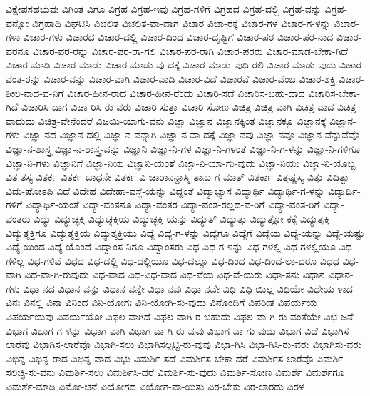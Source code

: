 {ವಿಕ್ಷೇಪಸಹಭುವಃ
ವಿಗಿಂತ
ವಿಗೂ
ವಿಗ್ರಹ
ವಿಗ್ರಹ-ಇವು
ವಿಗ್ರಹ-ಗಳಿಗೆ
ವಿಗ್ರಹದ
ವಿಗ್ರಹ-ದಲ್ಲಿ
ವಿಗ್ರಹ-ವನ್ನು
ವಿಗ್ರಹ-ವನ್ನೋ
ವಿಗ್ರಹಾದಿ
ವಿಘಟಿಸಿ
ವಿಚಲಿತ
ವಿಚಲಿತ-ವಾ-ದಾಗ
ವಿಚಾರ
ವಿಚಾ-ರಕ್ಕೆ
ವಿಚಾರ-ಗಳ
ವಿಚಾರ-ಗ-ಳನ್ನು
ವಿಚಾರ-ಗಳಾ
ವಿಚಾರ-ಗಳು
ವಿಚಾರದ
ವಿಚಾರ-ದಲ್ಲಿ
ವಿಚಾರ-ದಿಂದ
ವಿಚಾರ-ದೃಷ್ಟಿಗೆ
ವಿಚಾರ-ಪರ
ವಿಚಾರ-ಪರ-ನಾದ
ವಿಚಾರ-ಪರನೂ
ವಿಚಾರ-ಪರ-ರನ್ನು
ವಿಚಾರ-ಪರ-ರಾ-ಗಲಿ
ವಿಚಾರ-ಪರ-ರಾಗಿ
ವಿಚಾರ-ಪರರು
ವಿಚಾರ-ಮಾಡ-ಬೇಕಾ-ಗಿದೆ
ವಿಚಾರ-ಮಾಡಿ
ವಿಚಾರ-ಮಾಡು
ವಿಚಾರ-ಮಾಡು-ವು-ದಕ್ಕೆ
ವಿಚಾರ-ಮಾಡು-ವುದಿ-ರಲಿ
ವಿಚಾರ-ಮಾಡು-ವುದು
ವಿಚಾರ-ವಂತ-ರನ್ನು
ವಿಚಾರ-ವನ್ನು
ವಿಚಾರ-ವಾಗಿ
ವಿಚಾರ-ವಾದಿ
ವಿಚಾರ-ವಿದೆ
ವಿಚಾರವೆ
ವಿಚಾರ-ವೆಂಬ
ವಿಚಾರ-ಶಕ್ತಿ
ವಿಚಾರ-ಶೀಲ-ನಾದ-ವ-ನಿಗೆ
ವಿಚಾರ-ಹೀನ-ರಾದ
ವಿಚಾರ-ಹೀನ-ರೆಂದು
ವಿಚಾರಿ-ಸದೆ
ವಿಚಾರಿಸ-ಬಹು-ದಾದ
ವಿಚಾರಿಸ-ಬೇಕಾ-ಗಿದೆ
ವಿಚಾರಿಸಿ-ದಾಗ
ವಿಚಾ-ರಿಸಿ-ರು-ವರು
ವಿಚಾರಿ-ಸುತ್ತಾ
ವಿಚಾರಿ-ಸೋಣ
ವಿಚಿತ್ರ
ವಿಚಿತ್ರ-ವಾಗಿ
ವಿಚಿತ್ರ-ವಾದ
ವಿಚಿತ್ರ-ವಾದುದು
ವಿಚಿತ್ರ-ವೇನೆಂದರೆ
ವಿಜಯಿ-ಯಾಗು-ವನು
ವಿಜ್ಞಾ
ವಿಜ್ಞಾನ
ವಿಜ್ಞಾನಕ್ಕಿಂತ
ವಿಜ್ಞಾನಕ್ಕೂ
ವಿಜ್ಞಾನಕ್ಕೆ
ವಿಜ್ಞಾನ-ಗಳು
ವಿಜ್ಞಾ-ನದ
ವಿಜ್ಞಾನ-ದಲ್ಲಿ
ವಿಜ್ಞಾ-ನ-ವನ್ನಾಗಿ
ವಿಜ್ಞಾ-ನ-ವಾ-ದಕ್ಕೆ
ವಿಜ್ಞಾ-ನವು
ವಿಜ್ಞಾ-ನವೂ
ವಿಜ್ಞಾನ-ವೆನ್ನುವೆವೊ
ವಿಜ್ಞಾ-ನ-ಶಾಸ್ತ್ರ
ವಿಜ್ಞಾ-ನ-ಶಾಸ್ತ್ರ-ವನ್ನು
ವಿಜ್ಞಾನಿ
ವಿಜ್ಞಾ-ನಿ-ಗಳ
ವಿಜ್ಞಾ-ನಿ-ಗಳಂತೆ
ವಿಜ್ಞಾ-ನಿ-ಗ-ಳನ್ನು
ವಿಜ್ಞಾ-ನಿ-ಗಳಿಗೂ
ವಿಜ್ಞಾ-ನಿ-ಗಳು
ವಿಜ್ಞಾನಿಗೆ
ವಿಜ್ಞಾ-ನಿಯ
ವಿಜ್ಞಾನಿ-ಯಂತೆ
ವಿಜ್ಞಾ-ನಿ-ಯಾ-ಗು-ವುದು
ವಿಜ್ಞಾ-ನಿಯು
ವಿಜ್ಞಾ-ನಿ-ಯೊಬ್ಬ
ವಿತ-ತಸ್ಯ
ವಿತರ್ಕ
ವಿತರ್ಕ-ಬಾಧನೇ
ವಿತರ್ಕ-ವಿ-ಚಾರಾನನ್ದಾಸ್ಮಿ-ತಾನು-ಗ-ಮಾತ್
ವಿತರ್ಕಾ
ವಿತೃಷ್ಣಸ್ಯ
ವಿತ್ತು
ವಿದಿತ್ವಾ
ವಿದು-ಷೋಽಪಿ
ವಿದೆ
ವಿದೇಹ
ವಿದೇಹಾ-ವಸ್ಥೆ-ಯನ್ನು
ವಿದ್ದಂತೆ
ವಿದ್ಯಾಭ್ಯಾಸ
ವಿದ್ಯಾರ್ಥಿ
ವಿದ್ಯಾರ್ಥಿ-ಗ-ಳನ್ನು
ವಿದ್ಯಾರ್ಥಿ-ಗಳಿಗೆ
ವಿದ್ಯಾರ್ಥಿ-ಯಂತೆ
ವಿದ್ಯಾ-ವಂತನೂ
ವಿದ್ಯಾ-ವಂತರ
ವಿದ್ಯಾ-ವಂತ-ರಲ್ಲದ-ವ-ರಿಗೆ
ವಿದ್ಯಾ-ವಂತ-ರಿಗೆ
ವಿದ್ಯಾ-ವಂತರು
ವಿದ್ಯು
ವಿದ್ಯುಚ್ಛಕ್ತಿ
ವಿದ್ಯುಚ್ಛಕ್ತಿಯ
ವಿದ್ಯುಚ್ಛಕ್ತಿ-ಯನ್ನು
ವಿದ್ಯುತ್
ವಿದ್ಯುತ್ತು
ವಿದ್ಯುತ್ಲೋ-ಕಕ್ಕೆ
ವಿದ್ಯುತ್ಶಕ್ತಿ
ವಿದ್ಯುತ್ಶಕ್ತಿಗೂ
ವಿದ್ಯುತ್ಶಕ್ತಿಯ
ವಿದ್ಯುತ್ಶಕ್ತಿಯು
ವಿದ್ಯೆ
ವಿದ್ಯೆ-ಗ-ಳನ್ನು
ವಿದ್ಯೆಗೂ
ವಿದ್ಯೆಗೆ
ವಿದ್ಯೆಯ
ವಿದ್ಯೆ-ಯನ್ನು
ವಿದ್ಯೆ-ಯಷ್ಟು
ವಿದ್ಯೆ-ಯಿಂದ
ವಿದ್ಯೆ-ಯೊಂದೆ
ವಿದ್ವಾಂಸ-ನಿಗೂ
ವಿದ್ವಾಂಸರು
ವಿಧ
ವಿಧ-ಗ-ಳನ್ನು
ವಿಧ-ಗಳಲ್ಲಿ
ವಿಧ-ಗಳಲ್ಲಿಯೂ
ವಿಧ-ಗಳಿಲ್ಲ
ವಿಧ-ಗಳಿವೆ
ವಿಧದ
ವಿಧ-ದಲ್ಲಿ
ವಿಧ-ದಲ್ಲಿಯೂ
ವಿಧ-ದಲ್ಲೂ
ವಿಧ-ದಿಂದ
ವಿಧ-ದಿಂದ-ಲಾ-ದರೂ
ವಿಧಧ
ವಿಧ-ವಾಗಿ
ವಿಧ-ವಾ-ಗಿ-ರುವುದು
ವಿಧ-ವಾದ
ವಿಧ-ವಿಧ-ವಾದ
ವಿಧ-ವೆಯ
ವಿಧ-ವೆ-ಯರು
ವಿಧಾ-ತನು
ವಿಧಾನ
ವಿಧಾನ-ಗಳು
ವಿಧಾ-ನದ
ವಿಧಾನ-ವನ್ನು
ವಿಧಾನ-ವನ್ನೇ
ವಿಧಾ-ನವು
ವಿಧಾ-ನವೇ
ವಿಧಿ
ವಿಧಿ-ಯಿಲ್ಲ
ವಿಧಿಯೇ
ವಿಧೇಯ-ಳಾದ
ವಿನಃ
ವಿನಲ್ಲಿ
ವಿನಾ
ವಿನಿಂದ
ವಿನಿ-ಯೋಗಃ
ವಿನಿ-ಯೋಗಿ-ಸು-ವುದು
ವಿನೊಂದಿಗೆ
ವಿಪರೀತ
ವಿಪರ್ಯಯ
ವಿಪರ್ಯಯವು
ವಿಪರ್ಯಯೋ
ವಿಫಲ-ವಾಗಿದೆ
ವಿಫಲ-ವಾಗಿ-ರ-ಬಹುದು
ವಿಫಲ-ವಾ-ಗಿ-ರು-ವಂತೆಯೇ
ವಿಭ-ಜನೆ
ವಿಭಾಗ
ವಿಭಾಗ-ಗ-ಳನ್ನು
ವಿಭಾಗ-ವಾಗಿ
ವಿಭಾಗ-ವಾ-ಗಿ-ರು-ವುವು
ವಿಭಾಗ-ವಾ-ಗು-ವುದು
ವಿಭಾಗ-ವಿದೆ
ವಿಭಾಗಿಸ-ಲಾರೆವು
ವಿಭಾಗಿಸ-ಲಾರೆವೊ
ವಿಭಾಗಿ-ಸಲು
ವಿಭಾಗಿಸಲ್ಪಟ್ಟಿ-ರು-ವುವು
ವಿಭಾ-ಗಿಸಿ
ವಿಭಾ-ಗಿಸಿ-ರು-ವರು
ವಿಭಾಗಿಸು-ವರು
ವಿಭಿನ್ನ
ವಿಭಿನ್ನ-ರಾದ
ವಿಭಿನ್ನ-ವಾದ
ವಿಭು
ವಿಮರ್ಶಿ-ಸದೆ
ವಿಮರ್ಶಿಸ-ಬೇಕಾ-ದರೆ
ವಿಮರ್ಶಿಸ-ಲಾರೆವೊ
ವಿಮರ್ಶಿ-ಸಲಿಚ್ಛಿ-ಸು-ವನು
ವಿಮರ್ಶಿ-ಸಲು
ವಿಮರ್ಶಿಸಿ-ದರೆ
ವಿಮರ್ಶಿ-ಸು-ವುದು
ವಿಮರ್ಶಿ-ಸೋಣ
ವಿಮರ್ಶೆ
ವಿಮರ್ಶೆಗೂ
ವಿಮರ್ಶೆ-ಮಾಡಿ
ವಿಮೋ-ಚನೆ
ವಿಯೋಗದ
ವಿಯೋಗ-ವಾ-ಯಿತು
ವಿರ-ಬೇಕು
ವಿರ-ಲಾರದು
ವಿರಳ
}
